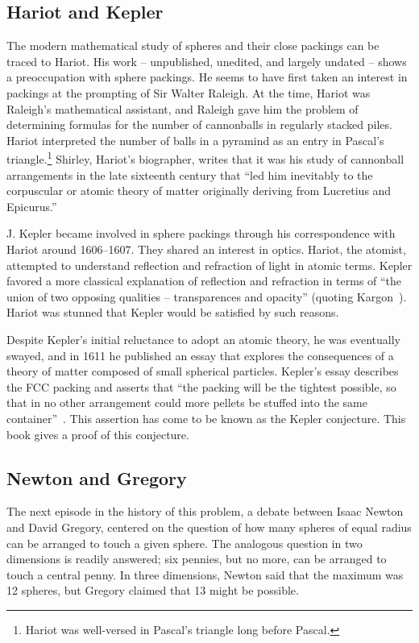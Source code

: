 \subsection{Hariot and Kepler}

The modern mathematical study of spheres and their close packings can
be traced to Hariot.  His work -- unpublished, unedited, and
largely undated -- shows a preoccupation with sphere packings.  He
seems to have first taken an interest in packings at the prompting of
Sir Walter Raleigh.  At the time, Hariot was Raleigh's mathematical
assistant, and Raleigh gave him the problem of determining formulas
for the number of cannonballs in regularly stacked piles.  Hariot
interpreted the number of balls in a pyramind as an entry in Pascal's
triangle.\footnote{Hariot was well-versed in Pascal's triangle long
  before Pascal.}  Shirley, Hariot's biographer, writes that it was
his study of cannonball arrangements in the late sixteenth century
that  ``led him inevitably to the corpuscular or atomic
theory of matter originally deriving from Lucretius and Epicurus.''
\cite[p.~242]{Shi83}

J. Kepler became involved in sphere packings through his correspondence
with Hariot around 1606--1607. They shared an interest in optics.
Hariot, the atomist, attempted to understand reflection and refraction
of light in atomic terms.  Kepler favored a more classical explanation of
reflection and refraction in terms of ``the union of two opposing
qualities -- transparences and opacity'' (quoting Kargon~\cite[p.26]{Kar66}).  
Hariot was stunned that
Kepler would be satisfied by such reasons.

Despite Kepler's initial reluctance to adopt an atomic
theory, he was eventually swayed, and in 1611 he published an essay
that explores the consequences of a theory of matter composed of small
spherical particles. 
Kepler's essay describes the FCC packing and asserts
that ``the packing will be the tightest possible, so that in no other
arrangement could more pellets be stuffed into the same
container''~\cite{Kep66}.  This assertion has come to be known as the
Kepler conjecture.  This book
gives a proof of this conjecture.

\subsection{Newton and Gregory}

The next episode in the history of this problem,  a debate between
Isaac Newton and David Gregory,  centered on the
question of how many spheres of equal radius can be arranged to touch
a given sphere.  The analogous question in two dimensions is readily answered;
six pennies, but no more, can be arranged
to touch a central penny.  In three dimensions, Newton said that the maximum was
12 spheres, but Gregory claimed that 13 might be possible.

